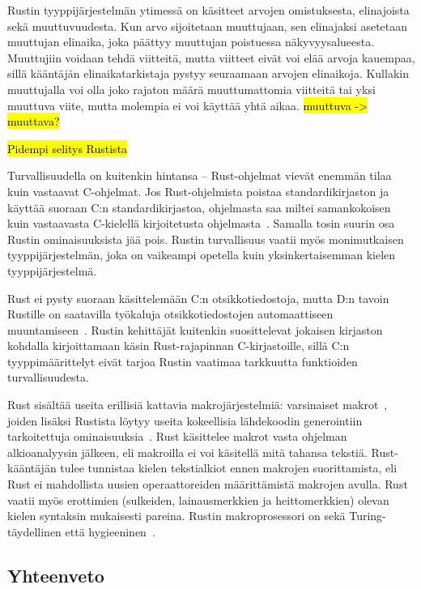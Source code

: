 Rustin tyyppijärjestelmän ytimessä on käsitteet arvojen
omistuksesta, elinajoista sekä
muuttuvuudesta. Kun arvo sijoitetaan muuttujaan, sen
elinajaksi asetetaan muuttujan elinaika, joka päättyy muuttujan poistuessa
näkyvyysalueesta. Muuttujiin voidaan tehdä viitteitä, mutta
viitteet eivät voi elää arvoja kauempaa, sillä kääntäjän
elinaikatarkistaja pystyy seuraamaan arvojen
elinaikoja. Kullakin muuttujalla voi olla joko rajaton määrä muuttumattomia
viitteitä tai yksi muuttuva viite, mutta molempia ei voi käyttää yhtä aikaa. \hl{muuttuva -> muuttava?}

\hl{Pidempi selitys Rustista}

Turvallisuudella on kuitenkin hintansa -- Rust-ohjelmat vievät enemmän tilaa
kuin vastaavat C-ohjelmat. Jos Rust-ohjelmista poistaa standardikirjaston ja
käyttää suoraan C:n standardikirjastoa, ohjelmasta saa miltei samankokoisen
kuin vastaavasta C-kielellä kirjoitetusta ohjelmasta~\citep{rustbinarysize}.
Samalla tosin suurin osa Rustin ominaisuuksista jää pois. Rustin turvallisuus
vaatii myös monimutkaisen tyyppijärjestelmän, joka on vaikeampi opetella kuin
yksinkertaisemman kielen tyyppijärjestelmä.

Rust ei pysty suoraan käsittelemään C:n otsikkotiedostoja, mutta D:n tavoin
Rustille on saatavilla työkaluja otsikkotiedostojen automaattiseen
muuntamiseen~\citep{rustbindgen}. Rustin kehittäjät kuitenkin suosittelevat
jokaisen kirjaston kohdalla kirjoittamaan käsin Rust-rajapinnan C-kirjastoille,
sillä C:n tyyppimäärittelyt eivät tarjoa Rustin vaatimaa tarkkuutta funktioiden
turvallisuudesta.

Rust sisältää useita erillisiä kattavia makrojärjestelmiä:
varsinaiset makrot~\citep{rustmacros}, joiden lisäksi Rustista löytyy useita
kokeellisia lähdekoodin generointiin tarkoitettuja
ominaisuuksia~\citep{rustprocmacros, rustplugins}. Rust käsittelee makrot vasta
ohjelman alkioanalyysin jälkeen, eli makroilla ei voi käsitellä mitä tahansa
tekstiä. Rust-kääntäjän tulee tunnistaa kielen tekstialkiot ennen makrojen
suorittamista, eli Rust ei mahdollista uusien operaattoreiden määrittämistä
makrojen avulla. Rust vaatii myös erottimien (sulkeiden, lainausmerkkien ja
heittomerkkien) olevan kielen syntaksin mukaisesti pareina. Rustin
makroprosessori on sekä Turing-täydellinen että hygieeninen~\citep{rustmacros}.

\subsection{Yhteenveto}

